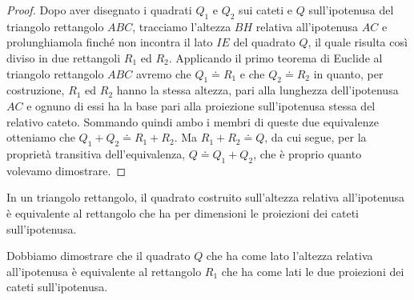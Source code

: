 \noindent\begin{minipage}{0.55\textwidth}\parindent15pt
\begin{proof}
Dopo aver disegnato i quadrati $Q_1$ e $Q_2$ sui cateti e $Q$ 
sull'ipotenusa del triangolo rettangolo $ABC$, tracciamo l'altezza 
$BH$ relativa all'ipotenusa $AC$ e prolunghiamola finché non incontra 
il lato $IE$ del quadrato $Q$, il quale risulta così diviso in due 
rettangoli $R_1$ ed $R_2$.
Applicando il primo teorema di Euclide al triangolo rettangolo $ABC$ 
avremo che $Q_1\doteq R_1$ e che $Q_2\doteq R_2$ in quanto, per 
costruzione, $R_1$ ed $R_2$ hanno la stessa altezza, pari alla 
lunghezza dell'ipotenusa $AC$ e ognuno di essi ha la base pari alla 
proiezione sull'ipotenusa stessa del relativo cateto. Sommando quindi 
ambo i membri di queste due equivalenze otteniamo che $Q_1+Q_2\doteq 
R_1+R_2$. Ma $R_1+R_2\doteq Q$, da cui segue, per la proprietà 
transitiva dell'equivalenza, $Q\doteq Q_1+Q_2$, che è proprio quanto 
volevamo dimostrare.
\end{proof}
\end{minipage}\hfil
\begin{minipage}{0.45\textwidth}
  \centering
\end{minipage}\vspace{8pt}


\begin{teorema}
In un triangolo rettangolo, il quadrato costruito sull'altezza 
relativa all'ipotenusa è equivalente al rettangolo che ha per 
dimensioni le proiezioni dei cateti sull'ipotenusa.
\end{teorema}

Dobbiamo dimostrare che il quadrato $Q$ che ha come lato l'altezza 
relativa all'ipotenusa è equivalente al rettangolo $R_1$ che ha come 
lati le due proiezioni dei cateti sull'ipotenusa.

